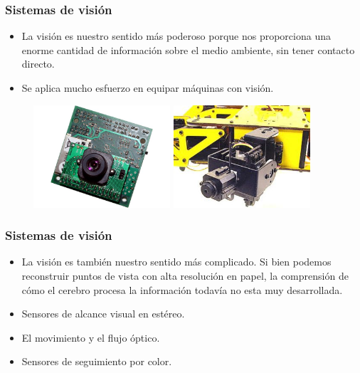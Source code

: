 \documentclass{beamer}
\begin{document}
\begin{frame}
\frametitle{Sistemas de visión}
\begin{itemize}
\item La visión es nuestro sentido más poderoso porque nos proporciona una enorme cantidad de información sobre el medio ambiente, sin tener contacto directo.
\item Se aplica mucho esfuerzo en equipar máquinas con visión.
\end{itemize}
\begin{figure}[!h]
\centering
\includegraphics[width=2in]{cam1}
\includegraphics[width=2in]{cam2}
\end{figure}
\end{frame}

\begin{frame}
\frametitle{Sistemas de visión}
\begin{itemize}
\item La visión es también nuestro sentido más complicado. Si bien podemos reconstruir puntos de vista con alta resolución en papel, la comprensión de cómo el cerebro procesa la información todavía no esta muy desarrollada.
\item Sensores de alcance visual en estéreo.
\item El movimiento y el flujo óptico.
\item Sensores de seguimiento por color.
\end{itemize}
\end{frame}
\end{document}
